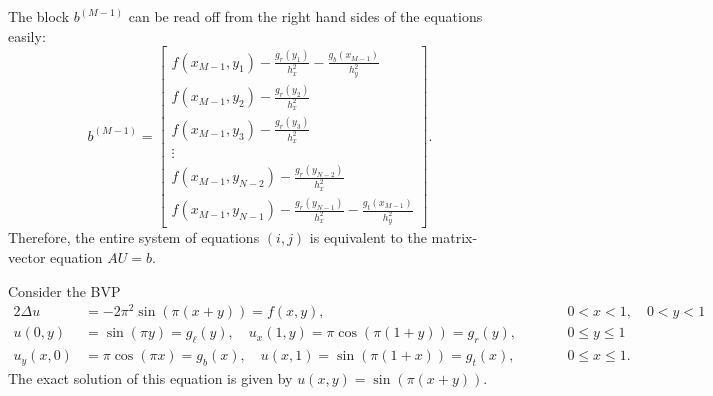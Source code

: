 \documentclass{homework}
\begin{document}
\begin{alphaparts}
\begin{equation*}
		\end{equation*}
		The block $b^{(M-1)}$ can be read off from the right hand sides of the equations easily:
		\begin{equation*}
			b^{(M-1)} = \left[\begin{matrix}
				f(x_{M-1},y_1) - \frac{g_r(y_1)}{h_x^2} - \frac{g_b(x_{M-1})}{h_y^2} \\
				f(x_{M-1},y_2) - \frac{g_r(y_2)}{h_x^2} \\
				f(x_{M-1},y_3) - \frac{g_r(y_3)}{h_x^2} \\
				\vdots \\
				f(x_{M-1},y_{N-2}) - \frac{g_r(y_{N-2})}{h_x^2}\\
				f(x_{M-1},y_{N-1}) - \frac{g_r(y_{N-1})}{h_x^2} - \frac{g_t(x_{M-1})}{h_y^2}
			\end{matrix}\right].
		\end{equation*}
		Therefore, the entire system of equations $(i,j)$ is equivalent to the matrix-vector equation $AU = b$.
	\end{alphaparts}
	
	\question Consider the BVP
	\begin{alignat*}{2}
		\Delta u &= -2\pi^2\sin(\pi(x+y)) = f(x,y), &\qquad &0<x<1, \quad 0<y<1 \\
		u(0,y) &= \sin(\pi y) = g_\ell(y), \quad u_x(1, y) = \pi\cos(\pi(1+y)) = g_r(y), & \qquad &0 \le y \le 1\\
		u_y(x,0) &= \pi\cos(\pi x) = g_b(x), \quad u(x, 1) = \sin(\pi(1+x)) = g_t(x), & \qquad &0 \le x \le 1. 
	\end{alignat*}
	The exact solution of this equation is given by $u(x,y) = \sin(\pi(x+y))$.
	
\end{document}
